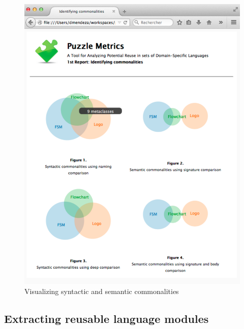 \begin{figure}
\centering
\includegraphics[width=1\linewidth]{images/domains-inaction.pdf}
\caption{Visualizing syntactic and semantic commonalities}
\label{fig:shape}
\end{figure}


\subsection{Extracting reusable language modules}

